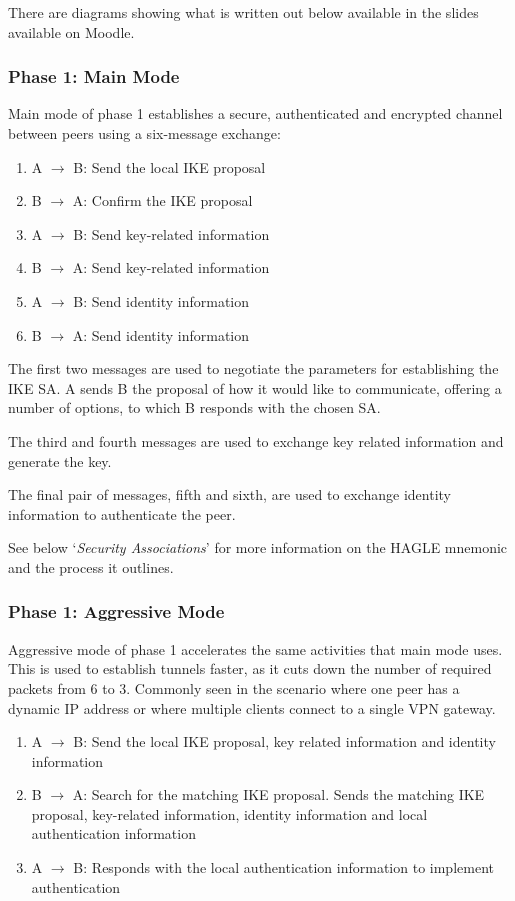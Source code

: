 \begin{extlink}
There are diagrams showing what is written out below available in the slides available on Moodle.
\end{extlink}

\subsubsection{Phase 1: Main Mode}
Main mode of phase 1 establishes a secure, authenticated and encrypted channel between peers using a six-message exchange:
\begin{enumerate}
    \item A $\rightarrow$ B: Send the local IKE proposal
    \item B $\rightarrow$ A: Confirm the IKE proposal
    \item A $\rightarrow$ B: Send key-related information
    \item B $\rightarrow$ A: Send key-related information
    \item A $\rightarrow$ B: Send identity information
    \item B $\rightarrow$ A: Send identity information
\end{enumerate}

The first two messages are used to negotiate the parameters for establishing the IKE SA. A sends B the proposal of how it would like to communicate, offering a number of options, to which B responds with the chosen SA. 

The third and fourth messages are used to exchange key related information and generate the key. 

The final pair of messages, fifth and sixth, are used to exchange identity information to authenticate the peer.

See below `\textit{Security Associations}' for more information on the HAGLE mnemonic and the process it outlines.

\subsubsection{Phase 1: Aggressive Mode}
Aggressive mode of phase 1 accelerates the same activities that main mode uses. This is used to establish tunnels faster, as it cuts down the number of required packets from 6 to 3. Commonly seen in the scenario where one peer has a dynamic IP address or where multiple clients connect to a single VPN gateway. 

\begin{enumerate}
    \item A $\rightarrow$ B: Send the local IKE proposal, key related information and identity information
    \item B $\rightarrow$ A: Search for the matching IKE proposal. Sends the matching IKE proposal, key-related information, identity information and local authentication information
    \item A $\rightarrow$ B: Responds with the local authentication information to implement authentication
\end{enumerate}

